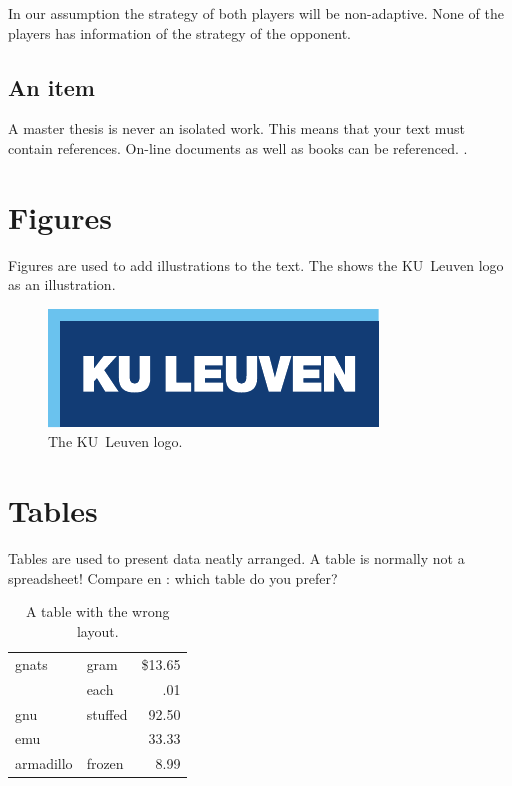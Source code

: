 In our assumption the strategy of both players will be non-adaptive. None of the players has information of the strategy of the opponent. 


\subsection{An item}
A master thesis is never an isolated work. This means that your text must
contain references. On-line documents\cite{FlipThem} as well as
books\cite{DefendingAgainstUnknownEnemy} can be referenced. \cite{Craig2005}.

\section{Figures}
Figures are used to add illustrations to the text. The  shows
the KU~Leuven logo as an illustration.
\begin{figure}
  \centering
  \includegraphics{logokul}
  \caption{The KU~Leuven logo.}
  \label{fig:logo}
\end{figure}

\section{Tables}
Tables are used to present data neatly arranged. A table is normally
not a spreadsheet! Compare  en : which table do
you prefer?

\begin{table}
  \centering
  \begin{tabular}{||l|lr||} \hline
    gnats     & gram      & \$13.65 \\ \cline{2-3}
              & each      & .01 \\ \hline
    gnu       & stuffed   & 92.50 \\ \cline{1-1} \cline{3-3}
    emu       &           & 33.33 \\ \hline
    armadillo & frozen    & 8.99 \\ \hline
  \end{tabular}
  \caption{A table with the wrong layout.}
  \label{tab:wrong}
\end{table}

